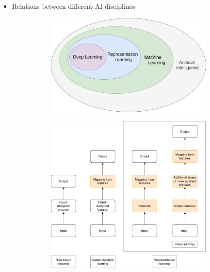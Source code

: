 \documentclass[t]{beamer} %
\begin{document}
\begin{frame}
    \begin{itemize}
        \item Relations between different AI disciplines
        \begin{figure}
            \begin{minipage}{0.45\textwidth}
                \begin{figure}[]
                    \centering
                    \includegraphics[width=\textwidth]{../plots/ai-venn.pdf}
                \end{figure}
            \end{minipage}\hfill
            \begin{minipage}{0.45\textwidth}
                \begin{figure}[]
                    \centering
                    \includegraphics[width=\textwidth]{../plots/ai-flowchart.pdf}

\end{figure}
\end{minipage}
\end{figure}
\end{itemize}
\end{frame}
\end{document}
